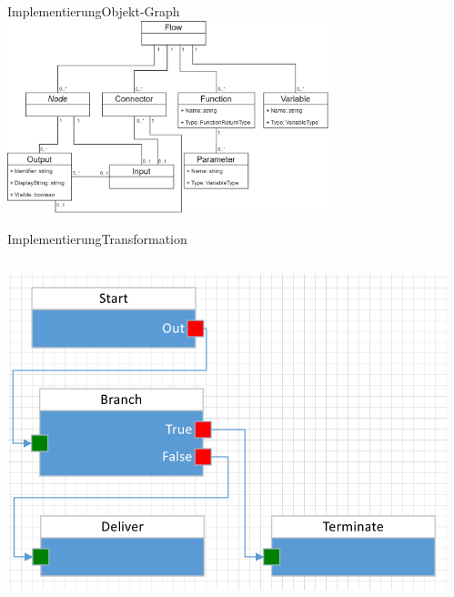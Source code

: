 \documentclass[t,aspectratio=169,divpsnames]{beamer}
\begin{document}
\begin{frame}{Implementierung}{Objekt-Graph}
	\center
	\includegraphics[width=0.7\textwidth]{img/FlowClassStructure.png}
\end{frame}

\begin{frame}[fragile]{Implementierung}{Transformation}
	\begin{columns}[T]
		\begin{column}{0.4\textwidth}
			\center
			\includegraphics[width=\textwidth]{img/FlowToCodeExample.png}
		\end{column}
		\begin{column}{0.6\textwidth}
			\only<2>
			{
				
			}
			{
				
			}
			{
				
			}
			{
				
			}
		\end{column}
	\end{columns}
\end{frame}
\end{document}
